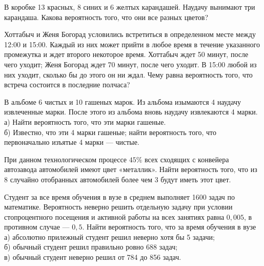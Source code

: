 \newpage\setcounter{zad}{0}



\begin{zkrW}{20}\noindent 
	В коробке 13 красных, 8 синих и 6 желтых карандашей. Наудачу вынимают три карандаша. Какова вероятность того, что они все разных цветов?
 
\end{zkrW}

\begin{zkrW}{20}\noindent 
	Хоттабыч и Женя Богорад условились встретиться в определенном месте между 12:00 и 15:00. Каждый из них может прийти в любое время в течение указанного промежутка и ждет второго некоторое время. Хоттабыч ждет 50 минут, после чего уходит; Женя Богорад ждет 70 минут, после чего уходит. В 15:00 любой из них уходит, сколько бы до этого он ни ждал. Чему равна вероятность того, что встреча состоится в последние полчаса?
 
\end{zkrW}

\begin{zkrW}{20}\noindent 
	В альбоме 6 чистых и 10 гашеных марок. Из альбома изымаются 4 наудачу извлеченные марки. После этого из альбома вновь наудачу извлекаются 4 марки. \\ \indent а) Найти вероятность того, что эти марки гашеные. \\ \indent б) Известно, что эти 4 марки гашеные; найти вероятность того, что первоначально изъятые 4 марки --- чистые.
 
\end{zkrW}

\begin{zkrW}{20}\noindent 
	При данном технологическом процессе $45\%$ всех сходящих с конвейера автозавода автомобилей имеют цвет «металлик». Найти вероятность того, что из 8 случайно отобранных автомобилей более чем 3 будут иметь этот цвет.
 
\end{zkrW}

\begin{zkrW}{20}\noindent 
	Студент за все время обучения в вузе в среднем выполняет 1600 задач по математике. Вероятность неверно решить отдельную задачу при условии стопроцентного посещения и активной работы на всех занятиях равна $0{,}005$, в противном случае --- $0{,}5$. Найти вероятность того, что за время обучения в вузе \\ \indent а) абсолютно прилежный студент решил неверно хотя бы 5 задачи; \\ \indent б) обычный студент решил правильно ровно 688 задач; \\ \indent в) обычный студент неверно решил от 784 до 856 задач.
 
\end{zkrW}

